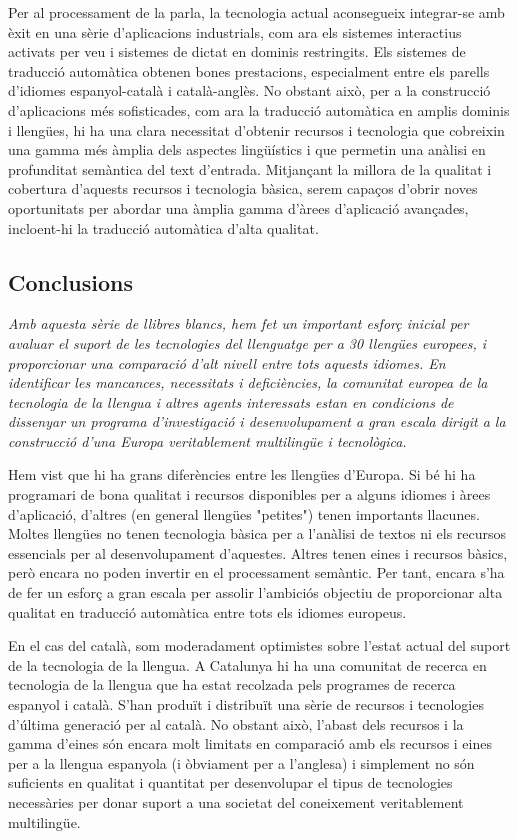 \begin{multicols}{2}
Per al processament de la parla, la tecnologia actual aconsegueix integrar-se amb èxit en una sèrie d'aplicacions industrials, com ara els sistemes interactius activats per veu i sistemes de dictat en dominis restringits. Els sistemes de traducció automàtica obtenen bones prestacions, especialment entre els parells d'idiomes espanyol-català i català-anglès. No obstant això, per a la construcció d'aplicacions més sofisticades, com ara la traducció automàtica en amplis dominis i llengües, hi ha una clara necessitat d'obtenir recursos i tecnologia que cobreixin una gamma més àmplia dels aspectes lingüístics i que permetin una anàlisi en profunditat semàntica del text d'entrada. Mitjançant la millora de la qualitat i cobertura d'aquests recursos i tecnologia bàsica, serem capaços d'obrir noves oportunitats per abordar una àmplia gamma d'àrees d'aplicació avançades, incloent-hi la traducció automàtica d'alta qualitat.

\subsection{Conclusions}

\emph{Amb aquesta sèrie de llibres blancs, hem fet un important esforç inicial per avaluar el suport de les tecnologies del llenguatge per a 30 llengües europees, i proporcionar una comparació d'alt nivell entre tots aquests idiomes. En identificar les mancances, necessitats i deficiències, la comunitat europea de la tecnologia de la llengua i altres agents interessats estan en condicions de dissenyar un programa d’investigació i desenvolupament a gran escala dirigit a la construcció d'una Europa veritablement multilingüe i tecnològica.}

Hem vist que hi ha grans diferències entre les llengües d'Europa. Si bé hi ha programari de bona qualitat i recursos disponibles per a alguns idiomes i àrees d'aplicació, d’altres (en general llengües "petites") tenen importants llacunes. Moltes llengües no tenen tecnologia bàsica per a l'anàlisi de textos ni els recursos essencials per al desenvolupament d'aquestes. Altres tenen eines i recursos bàsics, però encara no poden invertir en el processament semàntic. Per tant, encara s'ha de fer un esforç a gran escala per assolir l'ambiciós objectiu de proporcionar alta qualitat en traducció automàtica entre tots els idiomes europeus.

En el cas del català, som moderadament optimistes sobre l'estat actual del suport de la tecnologia de la llengua. A Catalunya hi ha una comunitat de recerca en tecnologia de la llengua que ha estat recolzada pels programes de recerca espanyol i català. S’han produït i distribuït una sèrie de recursos i tecnologies d'última generació per al català. No obstant això, l'abast dels recursos i la gamma d'eines són encara molt limitats en comparació amb els recursos i eines per a la llengua espanyola (i òbviament per a l'anglesa) i simplement no són suficients en qualitat i quantitat per desenvolupar el tipus de tecnologies necessàries per donar suport a una societat del coneixement veritablement multilingüe.


\end{multicols}

